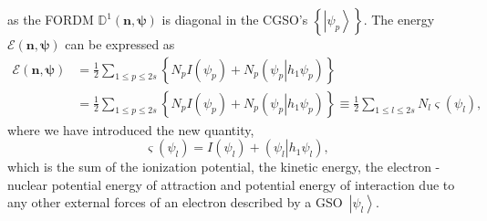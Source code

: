 \documentclass[aps,preprint]{revtex4}%
\begin{document}
as the FORDM $\mathbb{D}^{1}\left(  \mathbf{n},\mathbf{\psi}\right)  $ is
diagonal in the CGSO's $\left\{  \left\vert \psi_{p}\right\rangle \right\}  .$
The energy $\mathcal{E}\left(  \mathbf{n},\mathbf{\psi}\right)  $ can be
expressed as
\begin{align}
\mathcal{E}\left(  \mathbf{n},\mathbf{\psi}\right)   &  =\frac{1}{2}%
\sum_{1\leq p\leq2s}\left\{  N_{p}I\left(  \psi_{p}\right)  +N_{p}\left(
\left.  \psi_{p}\right\vert h_{1}\psi_{p}\right)  \right\} \\
&  =\frac{1}{2}\sum_{1\leq p\leq2s}\left\{  N_{p}I\left(  \psi_{p}\right)
+N_{p}\left(  \left.  \psi_{p}\right\vert h_{1}\psi_{p}\right)  \right\}
\equiv\frac{1}{2}%
{\textstyle\sum\limits_{1\leq l\leq2s}}
N_{l}\varsigma\left(  \psi_{l}\right)  ,
\end{align}
where we have introduced the new quantity,
\begin{equation}
\varsigma\left(  \psi_{l}\right)  =I\left(  \psi_{l}\right)  +\left(  \left.
\psi_{l}\right\vert h_{1}\psi_{l}\right)  ,
\end{equation}
which is the sum of the ionization potential, the kinetic energy, the electron
- nuclear potential energy of attraction and potential energy of interaction
due to any other external forces of an electron described by a
GSO\ $\left\vert \psi_{l}\right\rangle $.
\end{document}
